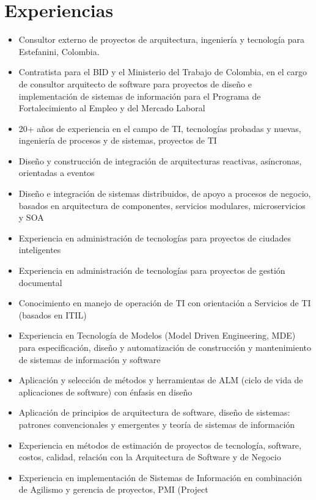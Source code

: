 \documentclass{tufte-handout}
\def\tightlist{}
\begin{document}
\section{Experiencias}\label{sec:experiencias}
\begin{itemize}
\tightlist
\item
  Consultor externo de proyectos de arquitectura, ingeniería y
  tecnología para Estefanini, Colombia.
\item
  Contratista para el BID y el Ministerio del Trabajo de Colombia, en el
  cargo de consultor arquitecto de software para proyectos de diseño e
  implementación de sistemas de información para el Programa de
  Fortalecimiento al Empleo y del Mercado Laboral
\item
  20+ años de experiencia en el campo de TI, tecnologías probadas y
  nuevas, ingeniería de procesos y de sistemas, proyectos de TI
\item
  Diseño y construcción de integración de arquitecturas reactivas,
  asíncronas, orientadas a eventos
\item
  Diseño e integración de sistemas distribuidos, de apoyo a procesos de
  negocio, basados en arquitectura de componentes, servicios modulares,
  microservicios y SOA
\item
  Experiencia en administración de tecnologías para proyectos de
  ciudades inteligentes
\item
  Experiencia en administración de tecnologías para proyectos de gestión
  documental
\item
  Conocimiento en manejo de operación de TI con orientación a Servicios
  de TI (basados en ITIL)
\item
  Experiencia en Tecnología de Modelos (Model Driven Engineering, MDE)
  para especificación, diseño y automatización de construcción y
  mantenimiento de sistemas de información y software
\item
  Aplicación y selección de métodos y herramientas de ALM (ciclo de vida
  de aplicaciones de software) con énfasis en diseño
\item
  Aplicación de principios de arquitectura de software, diseño de
  sistemas: patrones convencionales y emergentes y teoría de sistemas de
  información
\item
  Experiencia en métodos de estimación de proyectos de tecnología,
  software, costos, calidad, relación con la Arquitectura de Software y
  de Negocio
\item
  Experiencia en implementación de Sistemas de Información en
  combinación de Agilismo y gerencia de proyectos, PMI (Project

\end{itemize}
\end{document}
